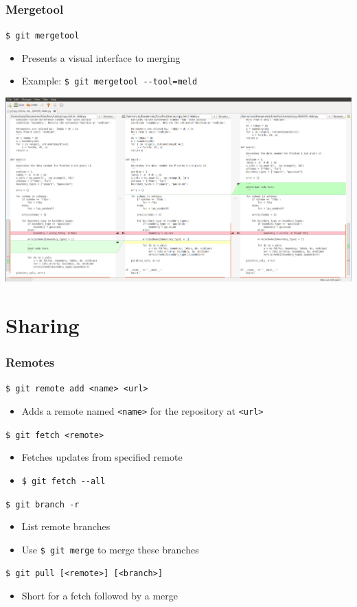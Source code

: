 \documentclass[english,compress]{beamer}
\begin{document}
\begin{frame}[fragile]
    \frametitle{Mergetool}

    \verb|$ git mergetool|
    \begin{itemize}
        \item Presents a visual interface to merging
        \item Example: \verb|$ git mergetool --tool=meld|
    \end{itemize}
    \begin{center}
        \includegraphics[width=.9\textwidth]{figs/meld-screenshot}
    \end{center}

\end{frame}

\section{Sharing}
\begin{frame}[fragile]
    \frametitle{Remotes}

    \verb|$ git remote add <name> <url>|
    \begin{itemize}
        \item Adds a remote named \verb|<name>| for the repository at \verb|<url>|
    \end{itemize}

    \verb|$ git fetch <remote>|
    \begin{itemize}
        \item Fetches updates from specified remote
        \item \verb|$ git fetch --all|
    \end{itemize}

    \verb|$ git branch -r |
    \begin{itemize}
        \item List remote branches
        \item Use \verb|$ git merge| to merge these branches
    \end{itemize}

    \verb|$ git pull [<remote>] [<branch>]|
    \begin{itemize}
        \item Short for a fetch followed by a merge
    \end{itemize}
\end{frame}
\end{document}
